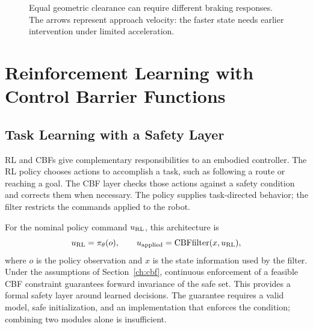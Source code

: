 \begin{figure}[H]
\centering
{}
\caption[Clearance and approach speed]{Equal geometric clearance can require different braking responses. The arrows represent approach velocity: the faster state needs earlier intervention under limited acceleration.}
\label{fig:hocbfbraking}
\end{figure}

\FloatBarrier
\section{Reinforcement Learning with Control Barrier Functions}
\label{ch:rlcbf}

\subsection{Task Learning with a Safety Layer}
RL and CBFs give complementary responsibilities to an embodied controller. The RL policy chooses actions to accomplish a task, such as following a route or reaching a goal. The CBF layer checks those actions against a safety condition and corrects them when necessary. The policy supplies task-directed behavior; the filter restricts the commands applied to the robot.

For the nominal policy command $u_{\rm RL}$, this architecture is
\begin{equation}
u_{\rm RL}=\pi_\theta(o),\qquad
u_{\rm applied}=\operatorname{CBFfilter}(x,u_{\rm RL}),
\end{equation}
where $o$ is the policy observation and $x$ is the state information used by the filter. Under the assumptions of Section~\ref{ch:cbf}, continuous enforcement of a feasible CBF constraint guarantees forward invariance of the safe set. This provides a formal safety layer around learned decisions. The guarantee requires a valid model, safe initialization, and an implementation that enforces the condition; combining two modules alone is insufficient.

